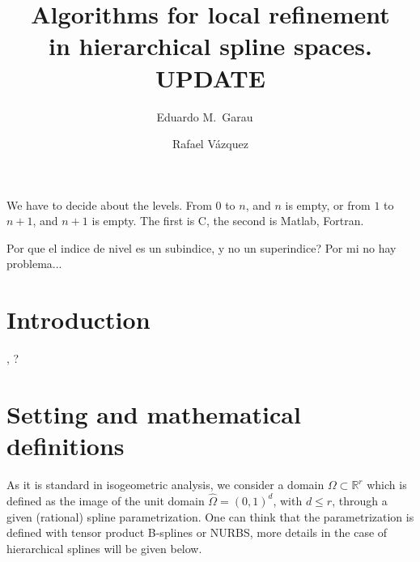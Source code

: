 \documentclass[a4paper]{siamltex1213}
\title{Algorithms for local refinement \\ in hierarchical spline spaces. {\Rd UPDATE}}
\author{Eduardo M.~Garau\footnotemark[1]\ \footnotemark[2]\ \and Rafael V\'azquez\footnotemark[3]}
\newcommand{\Rd}{\color{red}}
\newcommand{\snote}[1]{\fbox{\textbf{#1}}}
\newcommand{\RR}{\mathbb R}
\let\hat\widehat
\begin{document}
\maketitle

\renewcommand{\thefootnote}{\fnsymbol{footnote}}
\renewcommand{\thefootnote}{\arabic{footnote}}

% 
%  
% 
% 

{\Rd We have to decide about the levels. From 0 to $n$, and $n$ is empty, or from $1$ to $n+1$, and $n+1$ is empty. The first is C, the second is Matlab, Fortran.}

Por que el indice de nivel es un subindice, y no un superindice? Por mi no hay problema...

\section{Introduction}
\cite{Scott2014222,Bornemann2013584}, \cite{KGJ14}?

\section{Setting and mathematical definitions}
As it is standard in isogeometric analysis, we consider a domain $\Omega \subset \RR^r$ which is defined as the image of the unit domain $\hat \Omega = (0,1)^d$, with $d \le r$, through a given (rational) spline parametrization. One can think that the parametrization is defined with tensor product B-splines or NURBS, more details in the case of hierarchical splines will be given below.
\end{document}
